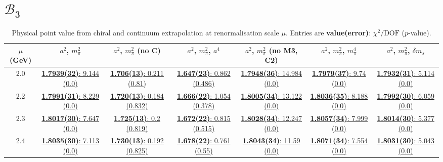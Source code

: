 \documentclass[12pt]{extarticle}
\begin{document}
\section{$\mathcal{B}_3$}
\begin{table}[h!]
\begin{center}
\begin{tabular}{|c|c|c|c|c|c|c|}
\hline
$\mu$ (GeV) & $a^2$, $m_\pi^2$& $a^2$, $m_\pi^2$ (no C)& $a^2$, $m_\pi^2$, $a^4$& $a^2$, $m_\pi^2$ (no M3, C2)& $a^2$, $m_\pi^2$, $m_\pi^4$& $a^2$, $m_\pi^2$, $\delta m_s$\\
\hline
2.0& \hyperlink{SSmPP/NPR/bag_a2m2_20.pdf.1}{\textbf{1.7939(32)}: 9.144 (0.0)} & \hyperlink{SSmPP/NPR/bag_a2m2noC_20.pdf.1}{\textbf{1.706(13)}: 0.211 (0.81)} & \hyperlink{SSmPP/NPR/bag_a2a4m2_20.pdf.1}{\textbf{1.647(23)}: 0.862 (0.486)} & \hyperlink{SSmPP/NPR/bag_a2m2mcut_20.pdf.1}{\textbf{1.7948(36)}: 14.984 (0.0)} & \hyperlink{SSmPP/NPR/bag_a2m2m4_20.pdf.1}{\textbf{1.7979(37)}: 9.74 (0.0)} & \hyperlink{SSmPP/NPR/bag_a2m2delm_20.pdf.1}{\textbf{1.7932(31)}: 5.114 (0.0)}\\
2.2& \hyperlink{SSmPP/NPR/bag_a2m2_22.pdf.1}{\textbf{1.7991(31)}: 8.229 (0.0)} & \hyperlink{SSmPP/NPR/bag_a2m2noC_22.pdf.1}{\textbf{1.720(13)}: 0.184 (0.832)} & \hyperlink{SSmPP/NPR/bag_a2a4m2_22.pdf.1}{\textbf{1.666(22)}: 1.054 (0.378)} & \hyperlink{SSmPP/NPR/bag_a2m2mcut_22.pdf.1}{\textbf{1.8005(34)}: 13.122 (0.0)} & \hyperlink{SSmPP/NPR/bag_a2m2m4_22.pdf.1}{\textbf{1.8036(35)}: 8.188 (0.0)} & \hyperlink{SSmPP/NPR/bag_a2m2delm_22.pdf.1}{\textbf{1.7992(30)}: 6.059 (0.0)}\\
2.3& \hyperlink{SSmPP/NPR/bag_a2m2_23.pdf.1}{\textbf{1.8017(30)}: 7.647 (0.0)} & \hyperlink{SSmPP/NPR/bag_a2m2noC_23.pdf.1}{\textbf{1.725(13)}: 0.2 (0.819)} & \hyperlink{SSmPP/NPR/bag_a2a4m2_23.pdf.1}{\textbf{1.672(22)}: 0.815 (0.515)} & \hyperlink{SSmPP/NPR/bag_a2m2mcut_23.pdf.1}{\textbf{1.8028(34)}: 12.247 (0.0)} & \hyperlink{SSmPP/NPR/bag_a2m2m4_23.pdf.1}{\textbf{1.8057(34)}: 7.999 (0.0)} & \hyperlink{SSmPP/NPR/bag_a2m2delm_23.pdf.1}{\textbf{1.8014(30)}: 5.377 (0.0)}\\
2.4& \hyperlink{SSmPP/NPR/bag_a2m2_24.pdf.1}{\textbf{1.8035(30)}: 7.113 (0.0)} & \hyperlink{SSmPP/NPR/bag_a2m2noC_24.pdf.1}{\textbf{1.730(13)}: 0.192 (0.825)} & \hyperlink{SSmPP/NPR/bag_a2a4m2_24.pdf.1}{\textbf{1.678(22)}: 0.761 (0.55)} & \hyperlink{SSmPP/NPR/bag_a2m2mcut_24.pdf.1}{\textbf{1.8043(34)}: 11.59 (0.0)} & \hyperlink{SSmPP/NPR/bag_a2m2m4_24.pdf.1}{\textbf{1.8071(34)}: 7.554 (0.0)} & \hyperlink{SSmPP/NPR/bag_a2m2delm_24.pdf.1}{\textbf{1.8031(30)}: 5.043 (0.0)}\\
\hline
\end{tabular}
\caption{Physical point value from chiral and continuum extrapolation at renormalisation scale $\mu$. Entries are \textbf{value(error)}: $\chi^2/\text{DOF}$ ($p$-value).}
\end{center}
\end{table}
\end{document}
